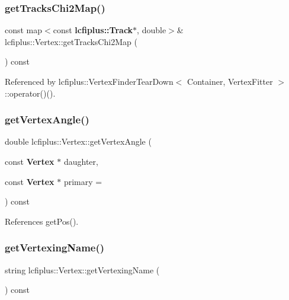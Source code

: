 \mbox{\label{classlcfiplus_1_1Vertex_a87fc25483403e5252f0938ea5cb6c7bd}} 
\subsubsection{get\+Tracks\+Chi2\+Map()}
{\footnotesize\ttfamily const map$<$const \textbf{ lcfiplus\+::\+Track}$\ast$, double$>$\& lcfiplus\+::\+Vertex\+::get\+Tracks\+Chi2\+Map (\begin{DoxyParamCaption}{ }\end{DoxyParamCaption}) const\hspace{0.3cm}{\ttfamily [inline]}}



Referenced by lcfiplus\+::\+Vertex\+Finder\+Tear\+Down$<$ Container, Vertex\+Fitter $>$\+::operator()().

\mbox{\label{classlcfiplus_1_1Vertex_a34a92e7ccab2665eaa43bf68b1b4c5d8}} 
\subsubsection{get\+Vertex\+Angle()}
{\footnotesize\ttfamily double lcfiplus\+::\+Vertex\+::get\+Vertex\+Angle (\begin{DoxyParamCaption}\item[{const \textbf{ Vertex} $\ast$}]{daughter,  }\item[{const \textbf{ Vertex} $\ast$}]{primary = {} }\end{DoxyParamCaption}) const}



References get\+Pos().

\mbox{\label{classlcfiplus_1_1Vertex_a712229e3156684b744a5db2c45be139b}} 
\subsubsection{get\+Vertexing\+Name()}
{\footnotesize\ttfamily string lcfiplus\+::\+Vertex\+::get\+Vertexing\+Name (\begin{DoxyParamCaption}{ }\end{DoxyParamCaption}) const\hspace{0.3cm}{\ttfamily [inline]}}

